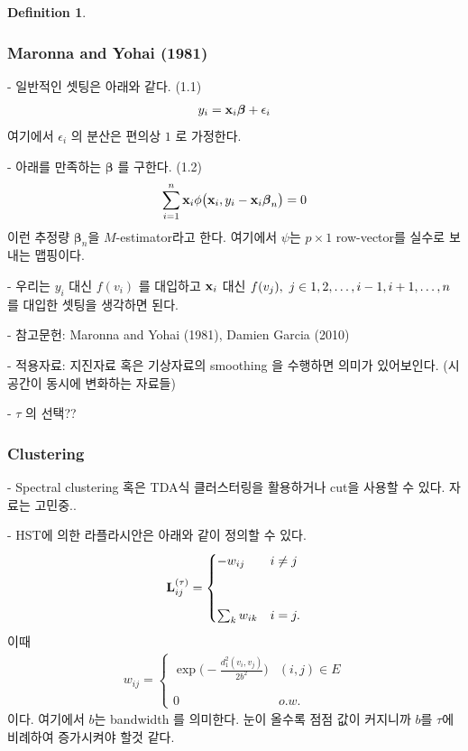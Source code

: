 \documentclass[preprint, review, 12pt]{article}
\theoremstyle{definition}
\newtheorem{dfn}{Definition}
\theoremstyle{remark}
\begin{document}
\begin{dfn}
\subsubsection*{Maronna and Yohai (1981)}

- 일반적인 셋팅은 아래와 같다. (1.1) 
\begin{align}
y_i={\bf x}_ i \boldsymbol{\beta}  +\epsilon_i 
\end{align}
여기에서 $\epsilon_i$ 의 분산은 편의상 $1$ 로 가정한다. 

- 아래를 만족하는 $\boldsymbol{\beta}$ 를 구한다. (1.2) 
\begin{align}
\sum_{i=1}^{n}{\bf x}_ i \phi\big({\bf x}_ i , y_i-{\bf x}_ i \boldsymbol{\beta}_ n\big) =0 
\end{align}
이런 추정량 $\boldsymbol{\beta}_ n$을 $M$-estimator라고 한다. 여기에서 $\psi$는 $p\times 1$ row-vector를 실수로 보내는 맵핑이다. 

- 우리는 $y_i$ 대신 $f(v_i)$ 를 대입하고 ${\bf x}_ i$ 대신 $f(v_j),~ j\in\\{1,2,\dots,i-1,i+1,\dots,n\\}$ 를 대입한 셋팅을 생각하면 된다. 

- 참고문헌: Maronna and Yohai (1981), Damien Garcia (2010) 

- 적용자료: 지진자료 혹은 기상자료의 smoothing 을 수행하면 의미가 있어보인다. (시공간이 동시에 변화하는 자료들) 

- $\tau$ 의 선택??

\subsubsection*{Clustering}

- Spectral clustering 혹은 TDA식 클러스터링을 활용하거나 cut을 사용할 수 있다. 자료는 고민중.. 

- HST에 의한 라플라시안은 아래와 같이 정의할 수 있다. 
\begin{align}
{\bf L}_ {ij}^{(\tau)}=
\begin{cases} 
-w_{ij} & i\neq j \\\\ \\
\sum_k w_{ik} & i=j. 
\end{cases} 
\end{align} 
이때 
\begin{align}
w_{ij}=\begin{cases}
\exp \Big(-\frac{d_1^2(v_i,v_j)}{2b^2}\Big) & (i,j) \in E \\\\ \\
0 & o.w.
\end{cases}
\end{align}
이다. 여기에서 $b$는 bandwidth 를 의미한다. 눈이 올수록 점점 값이 커지니까 $b$를 $\tau$에 비례하여 증가시켜야 할것 같다. 


\end{dfn}
\end{document}
